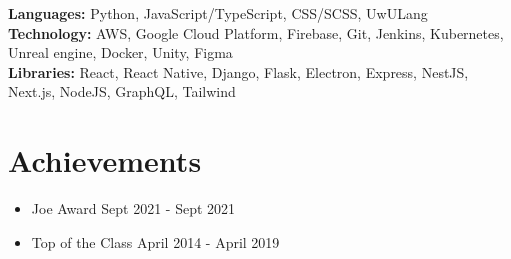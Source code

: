 \documentclass[letterpaper, 10pt]{article}
\newcommand{\secStartSpace}{\vspace{3pt}}
\newcommand{\secEndSpace}{\vspace{5pt}}
\begin{document}
\begin{addmargin}[0.5em]{1em}
	\noindent \textbf{Languages:} Python, JavaScript/TypeScript, CSS/SCSS, UwULang \\
	\noindent \textbf{Technology:} AWS, Google Cloud Platform, Firebase, Git, Jenkins, Kubernetes, Unreal engine, Docker, Unity, Figma \\
	\noindent \textbf{Libraries:} React, React Native, Django, Flask, Electron, Express, NestJS, Next.js, NodeJS, GraphQL, Tailwind
\end{addmargin}
\secEndSpace
\secEndSpace


\section{\color{blue} \textbf{Achievements}}
\secStartSpace

\hypersetup{
    colorlinks=true,
    linkcolor=HeaderColor,
    filecolor=HeaderColor,
    urlcolor=HeaderColor,
}

\begin{addmargin}[0.5em]{1em}
    \begin{itemize}[itemsep=-2.25pt, leftmargin=1.5em]
        \item Joe Award \hfill Sept 2021 - Sept 2021
        \item Top of the Class \hfill April 2014 - April 2019
    \end{itemize}
\end{addmargin}
\end{document}
